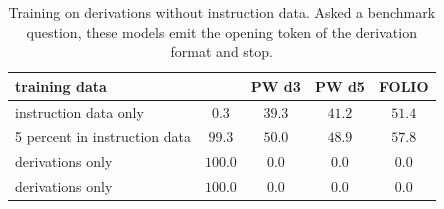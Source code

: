 \begin{table}[H]
\caption{Training on derivations without instruction data. Asked a benchmark question, these models emit the opening token of the derivation format and stop.}
\label{tab:alone}
\begin{center}
\small
\begin{tabular}{lcccc}
\toprule
training data & \branchproof{} & PW d3 & PW d5 & FOLIO \\
\midrule
instruction data only & $0.3$ & $39.3$ & $41.2$ & $51.4$ \\
5 percent \formal{} in instruction data & $99.3$ & $50.0$ & $48.9$ & $57.8$ \\
\formal{} derivations only & $100.0$ & $0.0$ & $0.0$ & $0.0$ \\
\nat{} derivations only & $100.0$ & $0.0$ & $0.0$ & $0.0$ \\
\bottomrule
\end{tabular}
\end{center}
\end{table}
